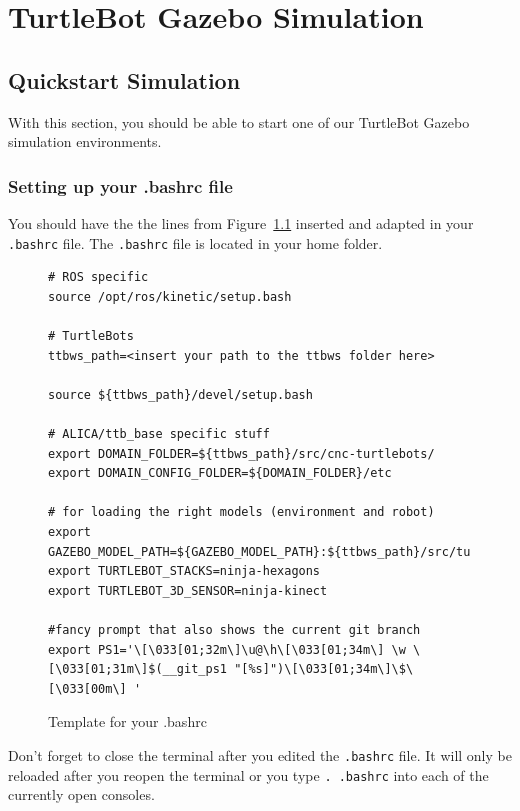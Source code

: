 \chapter{TurtleBot Gazebo Simulation}
\label{chap:TurtleBotGazeboSimulation}

\section{Quickstart Simulation}
\label{sec:QuickstartSimulation}

With this section, you should be able to start one of our TurtleBot Gazebo simulation environments. 

\subsection{Setting up your .bashrc file}
\label{ssec:bashrc}

You should have the the lines from Figure~\ref{fig:template_bashrc} inserted and adapted in your \verb$.bashrc$ file. The \verb$.bashrc$ file is located in your home folder. 
\begin{landscape}
  \begin{figure}[htbp]
    \begin{verbatim}
# ROS specific 
source /opt/ros/kinetic/setup.bash

# TurtleBots
ttbws_path=<insert your path to the ttbws folder here>

source ${ttbws_path}/devel/setup.bash

# ALICA/ttb_base specific stuff
export DOMAIN_FOLDER=${ttbws_path}/src/cnc-turtlebots/
export DOMAIN_CONFIG_FOLDER=${DOMAIN_FOLDER}/etc

# for loading the right models (environment and robot)
export GAZEBO_MODEL_PATH=${GAZEBO_MODEL_PATH}:${ttbws_path}/src/turtlebot/turtlebot_bringup/models
export TURTLEBOT_STACKS=ninja-hexagons
export TURTLEBOT_3D_SENSOR=ninja-kinect

#fancy prompt that also shows the current git branch
export PS1='\[\033[01;32m\]\u@\h\[\033[01;34m\] \w \[\033[01;31m\]$(__git_ps1 "[%s]")\[\033[01;34m\]\$\[\033[00m\] '
    \end{verbatim}
    \caption{Template for your .bashrc}
    \label{fig:template_bashrc}
  \end{figure}
\end{landscape}

Don't forget to close the terminal after you edited the \verb$.bashrc$ file. It will only be reloaded after you reopen the terminal or you type \verb$. .bashrc$ into each of the currently open consoles.

